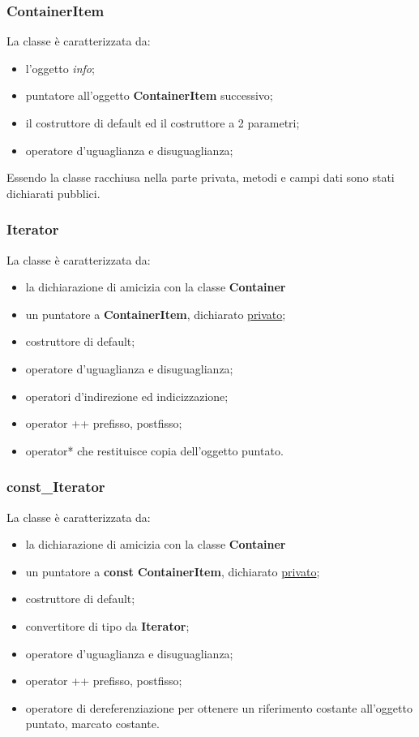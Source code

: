 {{			\subsubsection{ContainerItem}{
				La classe è caratterizzata da:
				\begin{itemize}\itemsep=0.5pt
					\item l'oggetto \textit{info};
					\item puntatore all'oggetto \textbf{ContainerItem} successivo;
					\item il costruttore di default ed il costruttore a 2 parametri;
					\item operatore d'uguaglianza e disuguaglianza;
				\end{itemize}
				Essendo la classe racchiusa nella parte privata,  metodi e campi dati sono stati dichiarati pubblici.
			}
			\subsubsection{Iterator}{
				La classe è caratterizzata da:
				\begin{itemize}\itemsep=0.5pt
					\item la dichiarazione di amicizia con la classe \textbf{Container}
					\item un puntatore a \textbf{ContainerItem}, dichiarato \underline{privato};
					\item costruttore di default;
					\item operatore d'uguaglianza e disuguaglianza;
					\item operatori d'indirezione ed indicizzazione; %
					\item operator ++ prefisso, postfisso;
					\item operator* che restituisce copia dell'oggetto puntato.
				\end{itemize}
			}
			\subsubsection{const\_Iterator}{
				La classe è caratterizzata da:
				\begin{itemize}\itemsep=0.5pt
					\item la dichiarazione di amicizia con la classe \textbf{Container}
					\item un puntatore a \textbf{const ContainerItem}, dichiarato \underline{privato};
					\item costruttore di default;
					\item convertitore di tipo da \textbf{Iterator};
					\item operatore d'uguaglianza e disuguaglianza;
					\item operator ++ prefisso, postfisso;
					\item operatore di dereferenziazione per ottenere un riferimento costante all'oggetto puntato, marcato costante.
				\end{itemize}
			}
}}
